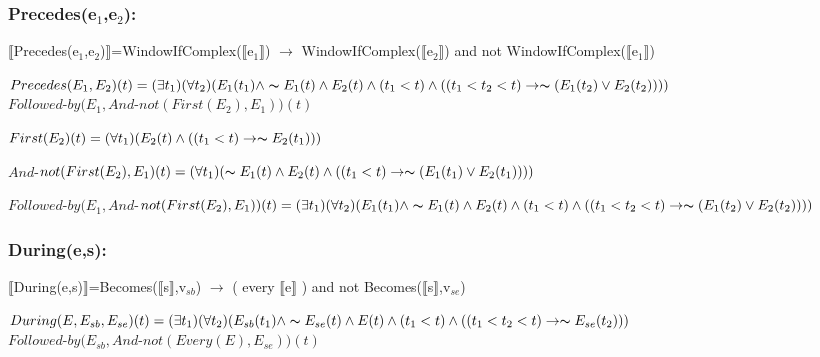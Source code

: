 \subsubsection*{Precedes(e$_1$,e$_2$):}
\begin{eplpseudocode}
$\llbracket$Precedes(e$_1$,e$_2$)$\rrbracket$=WindowIfComplex($\llbracket$e$_1$$\rrbracket$) $\rightarrow$ WindowIfComplex($\llbracket$e$_2$$\rrbracket$) and not WindowIfComplex($\llbracket$e$_1$$\rrbracket$) 
\end{eplpseudocode}

\(Precedes(E_1,E_2)(t)=(\exists t_1)(\forall t_2)(E_1(t_1)\wedge \thicksim E_1(t) \wedge E_2(t)\wedge (t_1<t)\wedge ((t_1<t_2<t)\rightarrow \thicksim (E_1(t_2)\vee E_2(t_2))))\)\\

$Followed$-\(by(E_1,And\)-\(not(First(E_2),E_1))(t)\)

\(First(E_2)(t)=(\forall t_1)(E_2(t)\wedge ((t_1<t)\rightarrow \thicksim E_2(t_1)))\)

$And$-\(not(First(E_2),E_1)(t)=(\forall t_1)(\thicksim E_1(t)\wedge E_2(t)\wedge ((t_1<t)\rightarrow \thicksim (E_1(t_1)\vee E_2(t_1))))\)

$Followed$-\(by(E_1,And\)-\(not(First(E_2),E_1))(t)=(\exists t_1)(\forall t_2)(E_1(t_1)\wedge \thicksim E_1(t) \wedge E_2(t)\wedge (t_1<t)\wedge ((t_1<t_2<t)\rightarrow \thicksim (E_1(t_2)\vee E_2(t_2))))\)\\

\subsubsection*{During(e,s):}
\begin{eplpseudocode}
$\llbracket$During(e,s)$\rrbracket$=Becomes($\llbracket$s$\rrbracket$,v$_{sb}$) $\rightarrow$ ( every $\llbracket$e$\rrbracket$ ) and not Becomes($\llbracket$s$\rrbracket$,v$_{se}$)
\end{eplpseudocode}
\(During(E,E_{sb},E_{se})(t)=(\exists t_1)(\forall t_2)(E_{sb}(t_1)\wedge \thicksim E_{se}(t)\wedge E(t)\wedge (t_1<t)\wedge ((t_1<t_2< t)\rightarrow \thicksim E_{se}(t_2)))\)\\


$Followed$-\(by(E_{sb},And\)-\(not(Every(E),E_{se}))(t)\)

